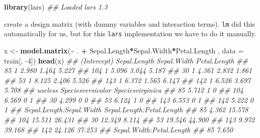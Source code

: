 \documentclass[
  notitlepage]{book}
\newenvironment{Shaded}{\begin{snugshade}}{\end{snugshade}}
\newcommand{\CommentTok}[1]{\textcolor[rgb]{0.56,0.35,0.01}{\textit{#1}}}
\newcommand{\DataTypeTok}[1]{\textcolor[rgb]{0.13,0.29,0.53}{#1}}
\newcommand{\DecValTok}[1]{\textcolor[rgb]{0.00,0.00,0.81}{#1}}
\newcommand{\KeywordTok}[1]{\textcolor[rgb]{0.13,0.29,0.53}{\textbf{#1}}}
\newcommand{\NormalTok}[1]{#1}
\newcommand{\OperatorTok}[1]{\textcolor[rgb]{0.81,0.36,0.00}{\textbf{#1}}}
\newcommand{\StringTok}[1]{\textcolor[rgb]{0.31,0.60,0.02}{#1}}
\begin{document}
\begin{Shaded}
\begin{Highlighting}[]
\KeywordTok{library}\NormalTok{(lars)}
\CommentTok{\#\# Loaded lars 1.3}
\end{Highlighting}
\end{Shaded}

create a design matrix (with dummy variables and interaction terms).
\texttt{lm} did this automatically for us, but for this \texttt{lars} implementation
we have to do it manually.

\begin{Shaded}
\begin{Highlighting}[]
\NormalTok{x \textless{}{-}}\StringTok{ }\KeywordTok{model.matrix}\NormalTok{(}\OperatorTok{\textasciitilde{}}\StringTok{ }\NormalTok{. }\OperatorTok{+}\StringTok{ }\NormalTok{Sepal.Length}\OperatorTok{*}\NormalTok{Sepal.Width}\OperatorTok{*}\NormalTok{Petal.Length ,}
  \DataTypeTok{data =}\NormalTok{ train[, }\DecValTok{{-}4}\NormalTok{])}
\KeywordTok{head}\NormalTok{(x)}
\CommentTok{\#\#     (Intercept) Sepal.Length Sepal.Width Petal.Length}
\CommentTok{\#\# 85            1        2.980       1.464        5.227}
\CommentTok{\#\# 104           1        5.096       3.044        5.187}
\CommentTok{\#\# 30            1        4.361       2.832        1.861}
\CommentTok{\#\# 53            1        8.125       2.406        5.526}
\CommentTok{\#\# 143           1        6.372       1.565        6.147}
\CommentTok{\#\# 142           1        6.526       3.697        5.708}
\CommentTok{\#\#     useless Speciesversicolor Speciesvirginica}
\CommentTok{\#\# 85    5.712                 1                0}
\CommentTok{\#\# 104   6.569                 0                1}
\CommentTok{\#\# 30    4.299                 0                0}
\CommentTok{\#\# 53    6.124                 1                0}
\CommentTok{\#\# 143   6.553                 0                1}
\CommentTok{\#\# 142   5.222                 0                1}
\CommentTok{\#\#     Sepal.Length:Sepal.Width Sepal.Length:Petal.Length}
\CommentTok{\#\# 85                     4.362                    15.578}
\CommentTok{\#\# 104                   15.511                    26.431}
\CommentTok{\#\# 30                    12.349                     8.114}
\CommentTok{\#\# 53                    19.546                    44.900}
\CommentTok{\#\# 143                    9.972                    39.168}
\CommentTok{\#\# 142                   24.126                    37.253}
\CommentTok{\#\#     Sepal.Width:Petal.Length}
\CommentTok{\#\# 85                     7.650}

\end{Highlighting}
\end{Shaded}
\end{document}
